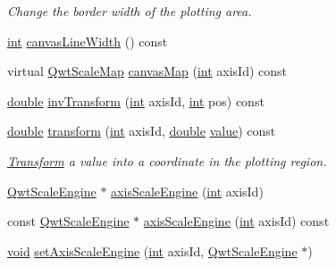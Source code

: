 \begin{DoxyCompactItemize}
\begin{DoxyCompactList}\small\item\em Change the border width of the plotting area. \end{DoxyCompactList}\item 
\hyperlink{ioapi_8h_a787fa3cf048117ba7123753c1e74fcd6}{int} \hyperlink{class_qwt_plot_a200c23f4574d857afc3f457999fcd0ce}{canvas\-Line\-Width} () const 
\item 
virtual \hyperlink{class_qwt_scale_map}{Qwt\-Scale\-Map} \hyperlink{class_qwt_plot_aff5efd21f11ec91fb8f791799cb4db2f}{canvas\-Map} (\hyperlink{ioapi_8h_a787fa3cf048117ba7123753c1e74fcd6}{int} axis\-Id) const 
\item 
\hyperlink{_super_l_u_support_8h_a8956b2b9f49bf918deed98379d159ca7}{double} \hyperlink{class_qwt_plot_ab98066e62e3a9f574f8f1d482974ef5c}{inv\-Transform} (\hyperlink{ioapi_8h_a787fa3cf048117ba7123753c1e74fcd6}{int} axis\-Id, \hyperlink{ioapi_8h_a787fa3cf048117ba7123753c1e74fcd6}{int} pos) const 
\item 
\hyperlink{_super_l_u_support_8h_a8956b2b9f49bf918deed98379d159ca7}{double} \hyperlink{class_qwt_plot_afbeb5482d0464fd17221a22cc6ba40b3}{transform} (\hyperlink{ioapi_8h_a787fa3cf048117ba7123753c1e74fcd6}{int} axis\-Id, \hyperlink{_super_l_u_support_8h_a8956b2b9f49bf918deed98379d159ca7}{double} \hyperlink{glext_8h_aa0e2e9cea7f208d28acda0480144beb0}{value}) const 
\begin{DoxyCompactList}\small\item\em \hyperlink{class_transform}{Transform} a value into a coordinate in the plotting region. \end{DoxyCompactList}\item 
\hyperlink{class_qwt_scale_engine}{Qwt\-Scale\-Engine} $\ast$ \hyperlink{class_qwt_plot_a619b65bb95090ab5a528e33a5014ae4f}{axis\-Scale\-Engine} (\hyperlink{ioapi_8h_a787fa3cf048117ba7123753c1e74fcd6}{int} axis\-Id)
\item 
const \hyperlink{class_qwt_scale_engine}{Qwt\-Scale\-Engine} $\ast$ \hyperlink{class_qwt_plot_a3e29973bcd6c879056ad655de8f667d8}{axis\-Scale\-Engine} (\hyperlink{ioapi_8h_a787fa3cf048117ba7123753c1e74fcd6}{int} axis\-Id) const 
\item 
\hyperlink{group___u_a_v_objects_plugin_ga444cf2ff3f0ecbe028adce838d373f5c}{void} \hyperlink{class_qwt_plot_abf09452377b53e584a5086354a134d78}{set\-Axis\-Scale\-Engine} (\hyperlink{ioapi_8h_a787fa3cf048117ba7123753c1e74fcd6}{int} axis\-Id, \hyperlink{class_qwt_scale_engine}{Qwt\-Scale\-Engine} $\ast$)
\item 

\end{DoxyCompactItemize}
